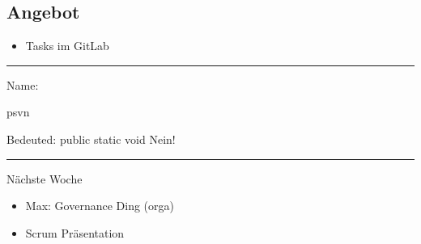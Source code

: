\hypertarget{angebot}{%
\subsection{Angebot}\label{angebot}}

\begin{itemize}
\tightlist
\item
  Tasks im GitLab
\end{itemize}

\begin{center}\rule{0.5\linewidth}{0.5pt}\end{center}

Name:

psvn

Bedeuted: public static void Nein!

\begin{center}\rule{0.5\linewidth}{0.5pt}\end{center}

Nächste Woche

\begin{itemize}
\tightlist
\item
  Max: Governance Ding (orga)
\item
  Scrum Präsentation
\end{itemize}
